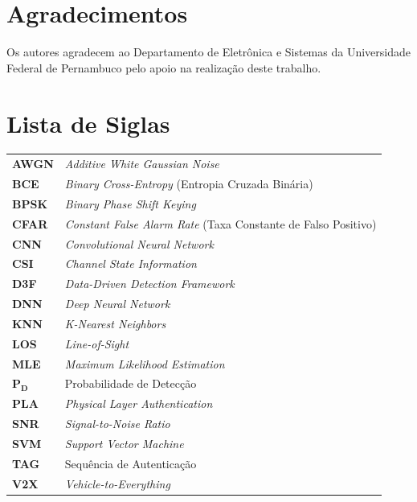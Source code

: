 \documentclass{sbrt}
\begin{document}
\section*{Agradecimentos}
Os autores agradecem ao Departamento de Eletrônica e Sistemas da Universidade Federal de Pernambuco pelo apoio na realização deste trabalho.

\section*{Lista de Siglas}
{\small
\begin{tabular}{@{}p{1.9cm}p{5.9cm}@{}}
\textbf{AWGN}      & \textit{Additive White Gaussian Noise} \\
\textbf{BCE}       & \textit{Binary Cross-Entropy} (Entropia Cruzada Binária) \\
\textbf{BPSK}      & \textit{Binary Phase Shift Keying} \\
\textbf{CFAR}      & \textit{Constant False Alarm Rate} (Taxa Constante de Falso Positivo) \\
\textbf{CNN}       & \textit{Convolutional Neural Network} \\
\textbf{CSI}       & \textit{Channel State Information} \\
\textbf{D3F}       & \textit{Data-Driven Detection Framework} \\
\textbf{DNN}       & \textit{Deep Neural Network} \\
\textbf{KNN}       & \textit{K-Nearest Neighbors} \\
\textbf{LOS}       & \textit{Line-of-Sight} \\
\textbf{MLE}       & \textit{Maximum Likelihood Estimation} \\
$\boldsymbol{P_D}$ & Probabilidade de Detecção \\
\textbf{PLA}       & \textit{Physical Layer Authentication} \\
\textbf{SNR}       & \textit{Signal-to-Noise Ratio} \\
\textbf{SVM}       & \textit{Support Vector Machine} \\
\textbf{TAG}       & Sequência de Autenticação \\
\textbf{V2X}       & \textit{Vehicle-to-Everything} \\
\end{tabular}
}
\end{document}
